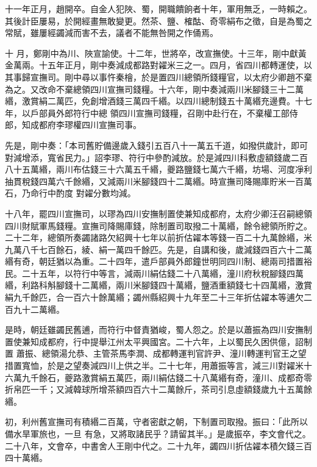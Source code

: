 \begin{pinyinscope}
 十一年正月，趙開卒。自金人犯陜、蜀，開職饋餉者十年，軍用無乏，一時賴之。其後計臣屢易，於開經畫無敢變更。然茶、鹽、榷酤、奇零絹布之徵，自是為蜀之常賦，雖屢經蠲減而害不去，議者不能無咎開之作俑焉。



 十
 月，鄭剛中為川、陜宣諭使。十二年，世將卒，改宣撫使。十三年，剛中獻黃金萬兩。十五年正月，剛中奏減成都路對糴米三之一。四月，省四川都轉運使，以其事歸宣撫司。剛中尋以事忤秦檜，於是置四川總領所錢糧官，以太府少卿趙不棄為之。又改命不棄總領四川宣撫司錢糧。十六年，剛中奏減兩川米腳錢三十二萬緡，激賞絹二萬匹，免創增酒錢三萬四千緡。以四川總制錢五十萬緡充邊費。十七年，以戶部員外郎符行中總
 領四川宣撫司錢糧，召剛中赴行在，不棄權工部侍郎，知成都府李璆權四川宣撫司事。



 先是，剛中奏：「本司舊貯備邊歲入錢引五百八十一萬五千道，如撥供歲計，即可對減增添，寬省民力。」詔李璆、符行中參酌減放。於是減四川科敷虛額錢歲二百八十五萬緡，兩川布估錢三十六萬五千緡，夔路鹽錢七萬六千緡，坊場、河度凈利抽貫稅錢四萬六千餘緡，又減兩川米腳錢四十二萬緡。時宣撫司降賜庫貯米一百萬石，乃命行中酌度
 對糴分數均減。



 十八年，罷四川宣撫司，以璆為四川安撫制置使兼知成都府，太府少卿汪召嗣總領四川財賦軍馬錢糧。宣撫司降賜庫錢，除制置司取撥二十萬緡，餘令總領所貯之。二十二年，總領所奏蠲諸路欠紹興十七年以前折估糴本等錢一百二十九萬餘緡，米九萬八千七百餘石，綾、絹一萬四千餘匹。先是，自講和後，歲減錢四百六十二萬緡有奇，朝廷猶以為重。二十四年，遣戶部員外郎鐘世明同四川制、總兩司措置裕
 民。二十五年，以符行中等言，減兩川絹估錢二十八萬緡，潼川府秋稅腳錢四萬緡，利路科斛腳錢十二萬緡，兩川米腳錢四十萬緡，鹽酒重額錢七十四萬緡，激賞絹九千餘匹，合一百六十餘萬緡；蠲州縣紹興十九年至二十三年折估糴本等逋欠二百九十二萬緡。



 是時，朝廷雖蠲民舊逋，而符行中督責猶峻，蜀人怨之。於是以蕭振為四川安撫制置使兼知成都府，行中提舉江州太平興國宮。二十六年，上以蜀民久困供億，詔制置
 蕭振、總領湯允恭、主管茶馬李澗、成都轉運判官許尹、潼川轉運判官王之望措置寬恤，於是之望奏減四川上供之半。二十七年，用蕭振等言，減三川對糴米十六萬九千餘石，夔路激賞絹五萬匹，兩川絹估錢二十八萬緡有奇，潼川、成都奇零折帛匹一千；又減韓球所增茶額四百六十二萬餘斤，茶司引息虛額錢歲九十五萬餘緡。



 初，利州舊宣撫司有積緡二百萬，守者密獻之朝，下制置司取撥。振曰：「此所以備水旱軍旅也，一旦
 有急，又將取諸民乎？請留其半。」是歲振卒，李文會代之。二十八年，文會卒，中書舍人王剛中代之。二十九年，蠲四川折估糴本積欠錢三百四十萬緡。




\end{pinyinscope}
